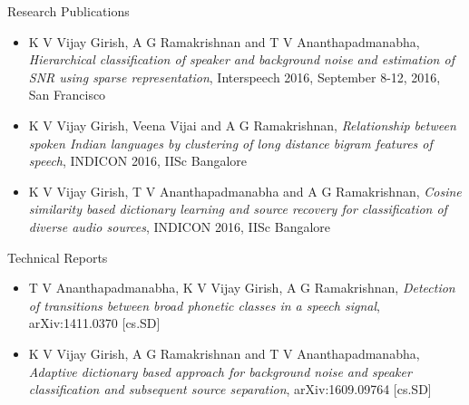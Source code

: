 \documentclass[10pt]{article}
\begin{document}
\begin{cv}
\begin{cvlist}{Research Publications}
\begin{itemize}
\item	K V Vijay Girish, A G Ramakrishnan and T V Ananthapadmanabha, \textit{Hierarchical classification of speaker and background noise and estimation of SNR using sparse representation}, Interspeech 2016, September 8-12, 2016, San Francisco

\item  K V Vijay Girish, Veena Vijai and A G Ramakrishnan,  \textit{Relationship between spoken Indian languages by clustering of long distance bigram features of speech},  INDICON 2016, IISc Bangalore

\item  K V Vijay Girish, T V Ananthapadmanabha and A G Ramakrishnan,  \textit{Cosine similarity based dictionary learning and source recovery for classification of diverse audio sources}, INDICON 2016, IISc Bangalore
	\end{itemize}

%
	


\end{cvlist}

\begin{cvlist}{Technical Reports}
\item
\begin{itemize}
\item T V Ananthapadmanabha, K V Vijay Girish, A G Ramakrishnan, \textit{Detection of transitions between broad phonetic classes in a speech signal}, 	arXiv:1411.0370 [cs.SD]

\item  K V Vijay Girish, A G Ramakrishnan and T V Ananthapadmanabha,  \textit{Adaptive dictionary based approach for background noise and speaker classification and subsequent source separation}, 	arXiv:1609.09764 [cs.SD]
\end{itemize}
\end{cvlist}


\end{cv}
\end{document}
